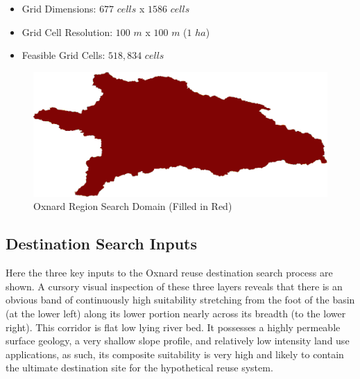     \begin{itemize}
      \setlength{\itemsep}{0cm}
      \setlength{\parskip}{0cm}
        \item Grid Dimensions: $677$ $cells$ x $1586$ $cells$
        \item Grid Cell Resolution: $100$ $m$ x $100$ $m$ ($1$ $ha$)
        \item Feasible Grid Cells: $518,834$ $cells$
    \end{itemize}
    
        \begin{figure}[!h]
            \begin{center}
            \includegraphics[width=5.5in]{figures/Oxnard_SearchDomain.png}   
            \caption{Oxnard Region Search Domain (Filled in Red)}
            \label{fig:Odomain}
            \end{center}
        \end{figure}
        
    \subsection{Destination Search Inputs}
    
Here the three key inputs to the Oxnard reuse destination search process are shown. A cursory visual inspection of these three layers reveals that there is an obvious band of continuously high suitability stretching from the foot of the basin (at the lower left) along its lower portion nearly across its breadth (to the lower right). This corridor is flat low lying river bed. It possesses a highly permeable surface geology, a very shallow slope profile, and relatively low intensity land use applications, as such, its composite suitability is very high and likely to contain the ultimate destination site for the hypothetical reuse system. 
    
